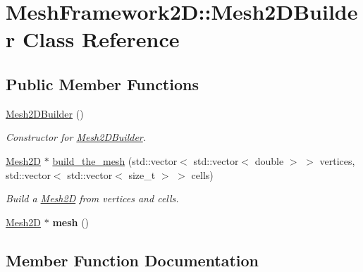 \hypertarget{classMeshFramework2D_1_1Mesh2DBuilder}{}\section{Mesh\+Framework2D\+:\+:Mesh2\+D\+Builder Class Reference}
\label{classMeshFramework2D_1_1Mesh2DBuilder}
\subsection*{Public Member Functions}
\begin{DoxyCompactItemize}
\item 
\mbox{\label{classMeshFramework2D_1_1Mesh2DBuilder_aace3b9d1ce3b4e0b53590b75f734dd96}} 
\hyperlink{classMeshFramework2D_1_1Mesh2DBuilder_aace3b9d1ce3b4e0b53590b75f734dd96}{Mesh2\+D\+Builder} ()
\begin{DoxyCompactList}\small\item\em Constructor for \hyperlink{classMeshFramework2D_1_1Mesh2DBuilder}{Mesh2\+D\+Builder}. \end{DoxyCompactList}\item 
\hyperlink{classMeshFramework2D_1_1Mesh2D}{Mesh2D} $\ast$ \hyperlink{classMeshFramework2D_1_1Mesh2DBuilder_a66379a977bf320cc456c4693b78707c8}{build\+\_\+the\+\_\+mesh} (std\+::vector$<$ std\+::vector$<$ double $>$ $>$ vertices, std\+::vector$<$ std\+::vector$<$ size\+\_\+t $>$ $>$ cells)
\begin{DoxyCompactList}\small\item\em Build a \hyperlink{classMeshFramework2D_1_1Mesh2D}{Mesh2D} from vertices and cells. \end{DoxyCompactList}\item 
\mbox{\label{classMeshFramework2D_1_1Mesh2DBuilder_a4d8abe2abb19344020602b357b609272}} 
\hyperlink{classMeshFramework2D_1_1Mesh2D}{Mesh2D} $\ast$ {\bfseries mesh} ()
\end{DoxyCompactItemize}


\subsection{Member Function Documentation}
\mbox{\label{classMeshFramework2D_1_1Mesh2DBuilder_a66379a977bf320cc456c4693b78707c8}} 
